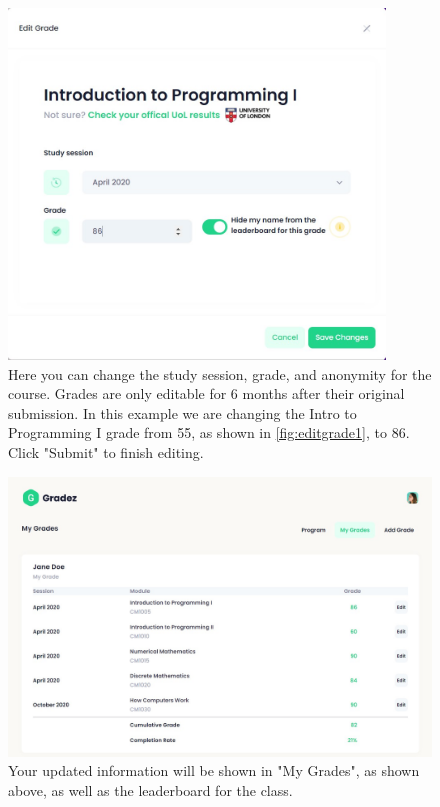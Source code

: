 \begin{figure}[H]
    \centering
    \includegraphics[width=10cm]{images/user-guide/edit-grade/2.jpg}
    \caption{Here you can change the study session, grade, and anonymity for the course. Grades are only editable for 6 months after their original submission. In this example we are changing the Intro to Programming I grade from 55, as shown in \cref{fig:editgrade1}, to 86. Click "Submit" to finish editing.}
    \label{fig:editgrade2}
\end{figure}

\begin{figure}[H]
    \centering
    \includegraphics[width=15cm]{images/user-guide/edit-grade/3.jpg}
    \caption{Your updated information will be shown in "My Grades", as shown above, as well as the leaderboard for the class.}
    \label{fig:editgrade3}
\end{figure}


